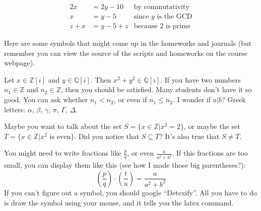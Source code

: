 \documentclass[11pt]{article}
\theoremstyle{quest}
\newcommand{\Q}{\mathbb{Q}}
\newcommand{\Z}{\mathbb{Z}}
\begin{document}
\begin{align*}
  2x &= 2y-10 & \text{by commutativity} \\
  x &=y-5  & \text{since $y$ is the GCD}\\
  z+x &= y-5+z & \text{because 2 is prime}
\end{align*}

Here are some symbols that might come up in the homeworks and journals (but remember you can view the source of the scripts and homeworks on the course webpage).

Let $x\in \Z[i]$ and $y\in \Q[i]$. Then $x^2+y^2\in \Q[i]$. If you have two numbers $n_1\in \Z$ and $n_2\in \Z$, then you should be satisfied. Many students don't have it so good. You can ask whether $n_1 < n_2$, or even if $n_1 \leq n_2$. I wonder if $a|b$? Greek letters: $\alpha$, $\beta$, $\gamma$, $\pi$, $\Gamma$, $\Delta$.

Maybe you want to talk about the set $S=\{ x\in \Z | x^2 = 2\}$, or maybe the set $T=\{ x\in \Z | x^2 \text{ is even}\}$. Did you notice that $S\subseteq T$? It's also true that $S \neq T$.

You might need to write fractions like $\frac{p}{q}$, or even $\frac{a}{a^2+b^2}$. If this fractions are too small, you can display them like this (see how I made those big parentheses?):
\[\left(\frac{p}{q}\right)\cdot \left(\frac{t}{u}\right) = \frac{a}{a^2+b^2}\]
If you can't figure out a symbol, you should google ``Detexify''. All you have to do is draw the symbol using your mouse, and it tells you the latex command.
\end{document}
